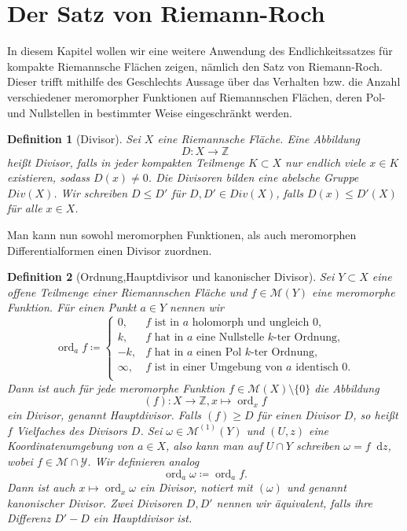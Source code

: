 \documentclass[11pt,a4paper,toc=bibliography]{scrartcl}
\theoremstyle{thm}
\theoremstyle{def}
\newtheorem{defi}{Definition}[section]
\theoremstyle{remark}
\DeclareMathOperator{\ord}{ord}
\newcommand*\dif{\mathop{}\!\mathrm{d}}\newcommand{\einschraenkung}{\,\rule[-5pt]{0.4pt}{12pt}\,{}} %
\begin{document}
\section{Der Satz von Riemann-Roch}
In diesem Kapitel wollen wir eine weitere Anwendung des Endlichkeitssatzes für kompakte Riemannsche Flächen zeigen, nämlich den Satz von Riemann-Roch. Dieser trifft mithilfe des Geschlechts Aussage über das Verhalten bzw. die Anzahl verschiedener meromorpher Funktionen auf Riemannschen Flächen, deren Pol-und Nullstellen in bestimmter Weise eingeschränkt werden.
\begin{defi}[Divisor]
	Sei $X$ eine Riemannsche Fläche. Eine Abbildung
	\[D:X\rightarrow\mathbb{Z}
	\]
	heißt \emph{Divisor}, falls in jeder kompakten Teilmenge $K\subset X$ nur endlich viele $x\in K$ existieren, sodass $D(x)\neq 0$. Die Divisoren bilden eine abelsche Gruppe $Div(X)$. Wir schreiben $D\leq D'$ für $D,D'\in Div(X)$, falls $D(x)\leq D'(X)$ für alle $x\in X$.
\end{defi}
Man kann nun sowohl meromorphen Funktionen, als auch meromorphen Differentialformen einen Divisor zuordnen.
\begin{defi}[Ordnung,Hauptdivisor und kanonischer Divisor]
	Sei $Y\subset X$ eine offene Teilmenge einer Riemannschen Fläche und $f\in \mathcal{M}(Y)$ eine meromorphe Funktion. Für einen Punkt $a\in Y$ nennen wir 
	\[
	\textstyle{\ord_a}f\coloneqq \begin{cases}
	0,& f\text{ ist in }a\text{ holomorph und ungleich }0,\\
	k,&f\text{ hat in }a\text{ eine Nullstelle }k\text{-ter Ordnung},\\
	-k,&f\text{ hat in }a\text{ einen Pol }k\text{-ter Ordnung},\\
	\infty,&f\text{ ist in einer Umgebung von }a\text{ identisch }0.\\
	\end{cases}
	\]
	Dann ist auch für jede meromorphe Funktion $f\in \mathcal{M}(X)\setminus \{0\}$ die Abbildung 
	\[
	(f):X\rightarrow \mathbb{Z},
	x\mapsto \ord_x f
	\]
	ein Divisor, genannt \emph{Hauptdivisor}. Falls $(f)\geq D$ für einen Divisor $D$, so heißt $f$ \emph{Vielfaches} des Divisors $D$.
	Sei $\omega\in\mathcal{M}^{(1)}(Y)$ und $(U,z)$ eine Koordinatenumgebung von $a\in X$, also kann man auf $U\cap Y$ schreiben $\omega =f\dif z$, wobei $f\in\mathcal{M\cap Y}$. Wir definieren analog
	\[\textstyle{\ord_a}\omega\coloneqq \textstyle{\ord_a}f.
	\]
	Dann ist auch $x\mapsto \ord_x\omega$ ein Divisor, notiert mit $(\omega)$ und genannt \emph{kanonischer Divisor}. Zwei Divisoren $D,D'$ nennen wir \emph{äquivalent}, falls ihre Differenz $D'-D$ ein Hauptdivisor ist.
\end{defi}
\end{document}
